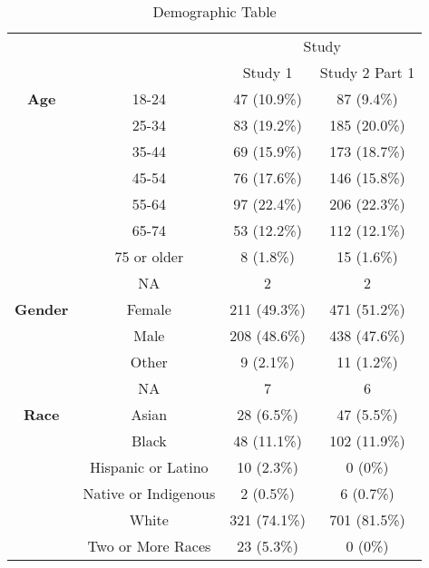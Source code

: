\begin{table}[!h]
\centering
\caption{\label{tab:demographics}Demographic Table}
\centering
\fontsize{10}{12}\selectfont
\begin{threeparttable}
\begin{tabular}[t]{>{}cccc}
\toprule
\multicolumn{2}{c}{ } & \multicolumn{2}{c}{Study} \\
\cmidrule(l{3pt}r{3pt}){3-4}
  &   & Study 1 & Study 2 Part 1\\
\midrule
\textbf{Age} & 18-24 & 47 (10.9\%) & 87 (9.4\%)\\

 & 25-34 & 83 (19.2\%) & 185 (20.0\%)\\

 & 35-44 & 69 (15.9\%) & 173 (18.7\%)\\

 & 45-54 & 76 (17.6\%) & 146 (15.8\%)\\

 & 55-64 & 97 (22.4\%) & 206 (22.3\%)\\

 & 65-74 & 53 (12.2\%) & 112 (12.1\%)\\

 & 75 or older & 8 (1.8\%) & 15 (1.6\%)\\

 & NA & 2 & 2\\
\cmidrule{1-4}
\textbf{Gender} & Female & 211 (49.3\%) & 471 (51.2\%)\\

 & Male & 208 (48.6\%) & 438 (47.6\%)\\

 & Other & 9 (2.1\%) & 11 (1.2\%)\\

 & NA & 7 & 6\\
\cmidrule{1-4}
\textbf{Race} & Asian & 28 (6.5\%) & 47 (5.5\%)\\

 & Black & 48 (11.1\%) & 102 (11.9\%)\\

 & Hispanic or Latino & 10 (2.3\%) & 0 (0\%)\\

 & Native or Indigenous & 2 (0.5\%) & 6 (0.7\%)\\

 & White & 321 (74.1\%) & 701 (81.5\%)\\

 & Two or More Races & 23 (5.3\%) & 0 (0\%)\\


\end{tabular}
\end{threeparttable}
\end{table}

